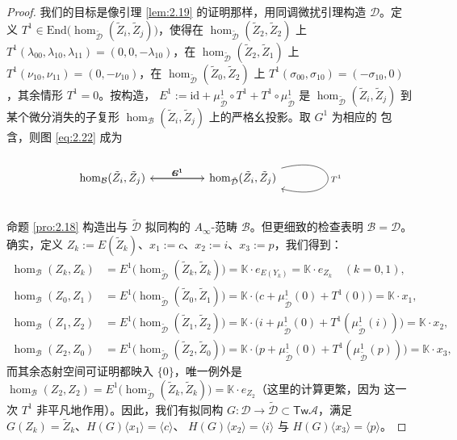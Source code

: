\begin{proof}
我们的目标是像引理 \ref{lem:2.19} 的证明那样，用同调微扰引理构造
$\mathcal D$。定义 $T^1\in\mathrm{End}\bigl(\hom_{\tilde{\mathcal D}}
(\tilde Z_i,\tilde Z_j)\bigr)$，使得在
$\hom_{\tilde{\mathcal D}}(\tilde Z_2,\tilde Z_2)$ 上
$T^1(\lambda_{00},\lambda_{10},\lambda_{11})=(0,0,-\lambda_{10})$，在
$\hom_{\tilde{\mathcal D}}(\tilde Z_2,\tilde Z_1)$ 上
$T^1(\nu_{10},\nu_{11})=(0,-\nu_{10})$，在
$\hom_{\tilde{\mathcal D}}(\tilde Z_0,\tilde Z_2)$ 上
$T^1(\sigma_{00},\sigma_{10})=(-\sigma_{10},0)$，其余情形 $T^1=0$。按构造，
$E^1:=\mathrm{id}+\mu^1_{\tilde{\mathcal D}}\circ T^1+T^1\circ
\mu^1_{\tilde{\mathcal D}}$ 是
$\hom_{\tilde{\mathcal D}}(\tilde Z_i,\tilde Z_j)$ 到某个微分消失的子复形
$\hom_{\mathcal B}(\tilde Z_i,\tilde Z_j)$ 上的严格幺投影。取 $G^1$ 为相应的
包含，则图 \eqref{eq:2.22} 成为
\[
  \begin{tikzcd}
    \hom_{\mathcal B}(\tilde Z_i,\tilde Z_j) \arrow[rr, "{G^1}"] & &
    \hom_{\tilde{\mathcal D}}(\tilde Z_i,\tilde Z_j)
    \arrow[ll, "{E^1}"'] \arrow[loop right, "{T^1}"]
  \end{tikzcd}
\]

命题 \ref{pro:2.18} 构造出与 $\tilde{\mathcal D}$ 拟同构的 $A_\infty$-范畴
$\mathcal B$。但更细致的检查表明 $\mathcal B=\mathcal D$。确实，定义
$Z_k:=E(\tilde Z_k)$、$x_1:=c$、$x_2:=i$、$x_3:=p$，我们得到：
\[
  \begin{aligned}
    \hom_{\mathcal B}(Z_k,Z_k)&=E^1\bigl(\hom_{\tilde{\mathcal D}}
    (\tilde Z_k,\tilde Z_k)\bigr)=\mathbb K\cdot e_{E(Y_k)}
    =\mathbb K\cdot e_{Z_k}\quad(k=0,1),\\
    \hom_{\mathcal B}(Z_0,Z_1)&=E^1\bigl(\hom_{\tilde{\mathcal D}}
    (\tilde Z_0,\tilde Z_1)\bigr)=\mathbb K\cdot\bigl(c+\mu^1_{\tilde{\mathcal D}}
    (0)+T^1(0)\bigr)=\mathbb K\cdot x_1,\\
    \hom_{\mathcal B}(Z_1,Z_2)&=E^1\bigl(\hom_{\tilde{\mathcal D}}
    (\tilde Z_1,\tilde Z_2)\bigr)=\mathbb K\cdot\bigl(i+\mu^1_{\tilde{\mathcal D}}
    (0)+T^1(\mu^1_{\tilde{\mathcal D}}(i))\bigr)=\mathbb K\cdot x_2,\\
    \hom_{\mathcal B}(Z_2,Z_0)&=E^1\bigl(\hom_{\tilde{\mathcal D}}
    (\tilde Z_2,\tilde Z_0)\bigr)=\mathbb K\cdot\bigl(p+\mu^1_{\tilde{\mathcal D}}
    (0)+T^1(\mu^1_{\tilde{\mathcal D}}(p))\bigr)=\mathbb K\cdot x_3,
  \end{aligned}
\]
而其余态射空间可证明都映入 $\{0\}$，唯一例外是
$\hom_{\mathcal B}(Z_2,Z_2)=E^1\bigl(\hom_{\tilde{\mathcal D}}
(\tilde Z_k,\tilde Z_k)\bigr)=\mathbb K\cdot e_{Z_2}$（这里的计算更繁，因为
这一次 $T^1$ 非平凡地作用）。因此，我们有拟同构
$G:\mathcal D\to\tilde{\mathcal D}\subset\mathsf{Tw}\mathcal A$，满足
$G(Z_k)=\tilde Z_k$、$H(G)\langle x_1\rangle=\langle c\rangle$、
$H(G)\langle x_2\rangle=\langle i\rangle$ 与
$H(G)\langle x_3\rangle=\langle p\rangle$。


\end{proof}
